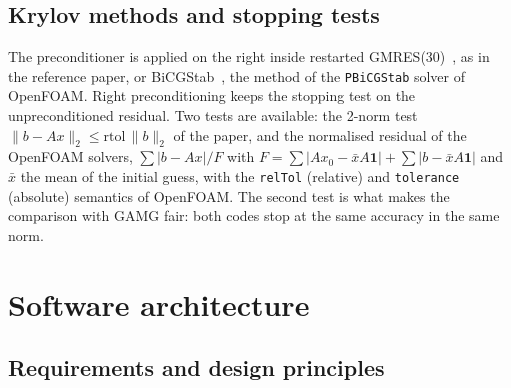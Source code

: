 \documentclass[11pt,a4paper]{article}
\begin{document}
\subsection{Krylov methods and stopping tests}\label{sec:krylov}

The preconditioner is applied on the right inside restarted GMRES(30)~\cite{Saad1986}, as in the reference
paper, or BiCGStab~\cite{VanDerVorst1992}, the method of the \texttt{PBiCGStab} solver of OpenFOAM. Right
preconditioning keeps the stopping test on the unpreconditioned residual. Two tests are available: the
2-norm test $\|b-Ax\|_2\leq \mathrm{rtol}\,\|b\|_2$ of the paper, and the normalised residual of the
OpenFOAM solvers, $\sum|b-Ax|/F$ with
$F=\sum|Ax_0-\bar{x}A\mathbf{1}|+\sum|b-\bar{x}A\mathbf{1}|$ and $\bar{x}$ the mean of the initial guess,
with the \texttt{relTol} (relative) and \texttt{tolerance} (absolute) semantics of OpenFOAM. The second test is
what makes the comparison with GAMG fair: both codes stop at the same accuracy in the same norm.

\section{Software architecture}\label{sec:architecture}

\subsection{Requirements and design principles}
\end{document}
